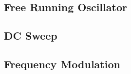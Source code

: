 \subsection{Free Running Oscillator}
\begin{figure}[H]
	\centering
	
\end{figure}

\begin{figure}[H]
	\centering
	
\end{figure}

\subsection{DC Sweep}
\begin{figure}[H]
	\centering
	
\end{figure}

\subsection{Frequency Modulation}
\begin{figure}[H]
	\centering
	
\end{figure}
